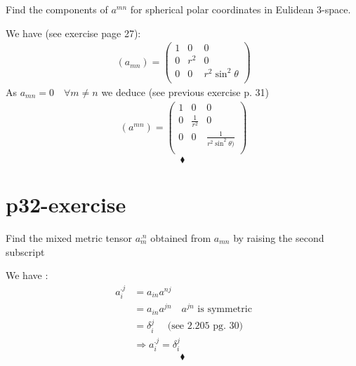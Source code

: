 \begin{tcolorbox}
Find the components of $a^{mn}$ for spherical polar coordinates in Eulidean 3-space.
\end{tcolorbox}
We have (see exercise page 27):
\begin{align*}
\ (a_{mn}) = \begin{pmatrix}
 1& 0 & 0\\
0 & r^2 & 0 \\
0 & 0 & r^2\sin^2\theta \\
\end{pmatrix}
\end{align*}
As $a_{mn} = 0 \quad \forall m \neq n$ we deduce (see previous exercise p. 31)
\begin{align*}
\ (a^{mn}) = \begin{pmatrix}
 1& 0 & 0\\
0 & \frac{1}{r^2} & 0 \\
0 & 0 & \frac{1}{r^2\sin^2\theta)}\\
\end{pmatrix}
\end{align*}
$$\blacklozenge$$
\newpage

\section{p32-exercise}

\begin{tcolorbox}
Find the mixed metric tensor  $a^{.n}_m$ obtained from $a_{mn}$ by raising the second subscript
\end{tcolorbox}
We have :
\begin{align*}
\ a_{i}^{.j} &=  a_{in}a^{nj}\\
\ &=  a_{in}a^{jn}\quad a^{jn} \text{  is symmetric}\\
\ &= \delta^j_i \quad \text{ (see 2.205 pg. 30)}\\
\ &\Rightarrow a_{i}^{.j} = \delta^j_i 
\end{align*}
$$\blacklozenge$$
\newpage

